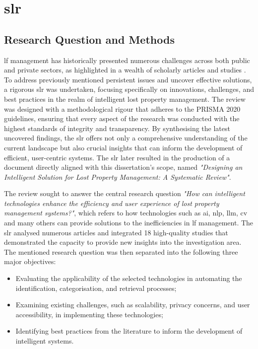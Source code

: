 \section{\acl{slr}} \label{sec:literature-review}

\subsection{Research Question and Methods} \label{subsec:slr}


\ac{lf} management has historically presented numerous challenges across both public and private sectors, as highlighted in a wealth of scholarly articles and studies \cite{Prawira2024}. To address previously mentioned persistent issues and uncover effective solutions, a rigorous \ac{slr} was undertaken, focusing specifically on innovations, challenges, and best practices in the realm of intelligent lost property management. The review was designed with a methodological rigour that adheres to the PRISMA 2020 guidelines, ensuring that every aspect of the research was conducted with the highest standards of integrity and transparency. By synthesising the latest uncovered findings, the \ac{slr} offers not only a comprehensive understanding of the current landscape but also crucial insights that can inform the development of efficient, user-centric systems. The \ac{slr} later resulted in the production of a document directly aligned with this dissertation's scope, named \textit{"Designing an Intelligent Solution for Lost Property Management: A Systematic Review"}.

The review sought to answer the central research question \textit{"How can intelligent technologies enhance the efficiency and user experience of lost property management systems?"}, which refers to how technologies such as \ac{ai}, \ac{nlp}, \ac{llm}, \ac{cv} and many others can provide solutions to the inefficiencies in \ac{lf} management. The \ac{slr} analysed numerous articles and integrated 18 high-quality studies that demonstrated the capacity to provide new insights into the investigation area. The mentioned research question was then separated into the following three major objectives:

\begin{itemize}
    \item Evaluating the applicability of the selected technologies in automating the identification, categorisation, and retrieval processes;
    \item Examining existing challenges, such as scalability, privacy concerns, and user accessibility, in implementing these technologies;
    \item Identifying best practices from the literature to inform the development of intelligent systems.
\end{itemize}

